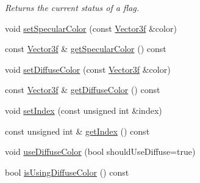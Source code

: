 \begin{DoxyCompactItemize}
\begin{DoxyCompactList}\small\item\em Returns the current status of a flag. \end{DoxyCompactList}\item 
void \hyperlink{classburn_1_1_material_ae50bc615e9bb17bc9eb232345fb1e776}{set\-Specular\-Color} (const \hyperlink{namespaceburn_a9d6d349c94bc4dc9699427216128a0ef}{Vector3f} \&color)
\item 
const \hyperlink{namespaceburn_a9d6d349c94bc4dc9699427216128a0ef}{Vector3f} \& \hyperlink{classburn_1_1_material_a732240fb8d7fe3f82e8ec2da93356b5e}{get\-Specular\-Color} () const 
\item 
void \hyperlink{classburn_1_1_material_a0b50c4daafb286d54d5159bc93fc695c}{set\-Diffuse\-Color} (const \hyperlink{namespaceburn_a9d6d349c94bc4dc9699427216128a0ef}{Vector3f} \&color)
\item 
const \hyperlink{namespaceburn_a9d6d349c94bc4dc9699427216128a0ef}{Vector3f} \& \hyperlink{classburn_1_1_material_a4572c25ee95804084e9dce9c1116f493}{get\-Diffuse\-Color} () const 
\item 
void \hyperlink{classburn_1_1_material_a730e2d8f5d444f6ce45e1f25a4f424d6}{set\-Index} (const unsigned int \&index)
\item 
const unsigned int \& \hyperlink{classburn_1_1_material_ab42a52377d982ebca5d17776c9b2b800}{get\-Index} () const 
\item 
void \hyperlink{classburn_1_1_material_a016895c77f4fd7393ab263ac7455e5a2}{use\-Diffuse\-Color} (bool should\-Use\-Diffuse=true)
\item 
bool \hyperlink{classburn_1_1_material_a4f2d46a41409a068985c7377eeb1f3c4}{is\-Using\-Diffuse\-Color} () const 
\end{DoxyCompactItemize}


